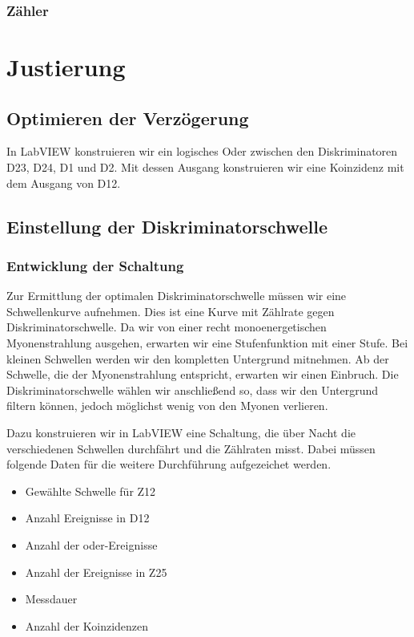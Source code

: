 \documentclass[11pt, ngerman, fleqn, DIV=15, headinclude, BCOR=2cm]{scrreprt}
\begin{document}
\subsubsection{Zähler}


\section{Justierung}

\subsection{Optimieren der Verzögerung}
\label{sec:optimieren_verzoegerung}

In LabVIEW konstruieren wir ein logisches Oder zwischen den Diskriminatoren
D23, D24, D1 und D2. Mit dessen Ausgang konstruieren wir eine Koinzidenz mit
dem Ausgang von D12.

\subsection{Einstellung der Diskriminatorschwelle}
\label{sec:einstellung_diskriminatorschwelle}

\subsubsection{Entwicklung der Schaltung}

Zur Ermittlung der optimalen Diskriminatorschwelle müssen wir eine
Schwellenkurve aufnehmen. Dies ist eine Kurve mit Zählrate gegen
Diskriminatorschwelle. Da wir von einer recht monoenergetischen Myonenstrahlung
ausgehen, erwarten wir eine Stufenfunktion mit einer Stufe. Bei kleinen
Schwellen werden wir den kompletten Untergrund mitnehmen. Ab der Schwelle, die
der Myonenstrahlung entspricht, erwarten wir einen Einbruch. Die
Diskriminatorschwelle wählen wir anschließend so, dass wir den Untergrund
filtern können, jedoch möglichst wenig von den Myonen verlieren.

Dazu konstruieren wir in LabVIEW eine Schaltung, die über Nacht die
verschiedenen Schwellen durchfährt und die Zählraten misst. Dabei müssen
folgende Daten für die weitere Durchführung aufgezeichet werden.

\begin{itemize}
    \item
        Gewählte Schwelle für Z12

    \item
        Anzahl Ereignisse in D12

    \item
        Anzahl der oder-Ereignisse

    \item
        Anzahl der Ereignisse in Z25

    \item
        Messdauer

    \item
        Anzahl der Koinzidenzen
\end{itemize}
\end{document}
